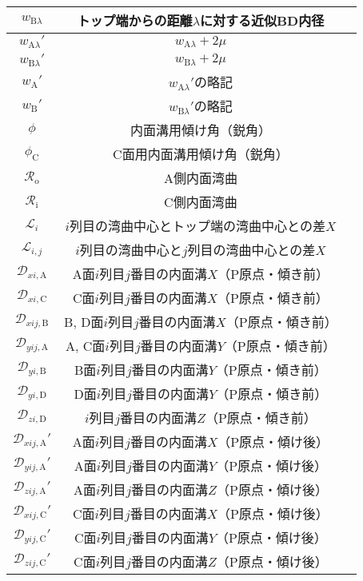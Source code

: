 \begin{longtable}{|c|Sl|}
$w_{\mathrm B\lambda}$ & トップ端からの距離$\lambda$に対する近似BD内径\\\hline
$w_{\mathrm A\lambda}'$ & $w_{\mathrm A\lambda}+2\mu$\\\hline
$w_{\mathrm B\lambda}'$ & $w_{\mathrm B\lambda}+2\mu$\\\hline
$w_{\mathrm A}'$ & $w_{\mathrm A\lambda}'$の略記\\\hline
$w_{\mathrm B}'$ & $w_{\mathrm B\lambda}'$の略記\\\hline
$\phi$ & 内面溝用傾け角（鋭角）\\\hline
$\phi_\mathrm C$ & C面用内面溝用傾け角（鋭角）\\\hline
$\mathcal R_\mathrm o$ & A側内面湾曲\\\hline
$\mathcal R_\mathrm i$ & C側内面湾曲\\\hline
$\mathcal L_i$ & $i$列目の湾曲中心とトップ端の湾曲中心との差$X$\\\hline
$\mathcal L_{i,j}$ & $i$列目の湾曲中心と$j$列目の湾曲中心との差$X$\\\hline
$\mathcal D_{xi,\mathrm A}$ & A面$i$列目$j$番目の内面溝$X$（P原点・傾き前）\\\hline
$\mathcal D_{xi,\mathrm C}$ & C面$i$列目$j$番目の内面溝$X$（P原点・傾き前）\\\hline
$\mathcal D_{xij,\mathrm B}$ & B, D面$i$列目$j$番目の内面溝$X$（P原点・傾き前）\\\hline
$\mathcal D_{yij,\mathrm A}$ & A, C面$i$列目$j$番目の内面溝$Y$（P原点・傾き前）\\\hline
$\mathcal D_{yi,\mathrm B}$ & B面$i$列目$j$番目の内面溝$Y$（P原点・傾き前）\\\hline
$\mathcal D_{yi,\mathrm D}$ & D面$i$列目$j$番目の内面溝$Y$（P原点・傾き前）\\\hline
$\mathcal D_{zi,\mathrm D}$ & $i$列目$j$番目の内面溝$Z$（P原点・傾き前）\\\hline
$\mathcal D_{xij,\mathrm A}'$ & A面$i$列目$j$番目の内面溝$X$（P原点・傾け後）\\\hline
$\mathcal D_{yij,\mathrm A}'$ & A面$i$列目$j$番目の内面溝$Y$（P原点・傾け後）\\\hline
$\mathcal D_{zij,\mathrm A}'$ & A面$i$列目$j$番目の内面溝$Z$（P原点・傾け後）\\\hline
$\mathcal D_{xij,\mathrm C}'$ & C面$i$列目$j$番目の内面溝$X$（P原点・傾け後）\\\hline
$\mathcal D_{yij,\mathrm C}'$ & C面$i$列目$j$番目の内面溝$Y$（P原点・傾け後）\\\hline
$\mathcal D_{zij,\mathrm C}'$ & C面$i$列目$j$番目の内面溝$Z$（P原点・傾け後）\\\hline

\end{longtable}
